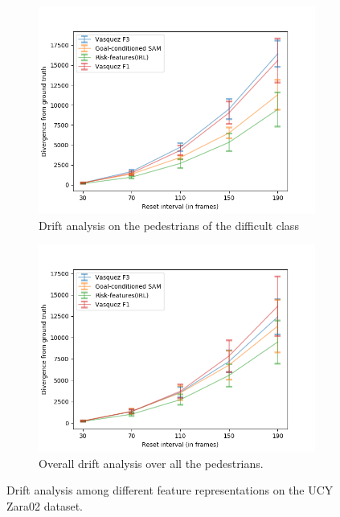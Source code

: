 \begin{figure}[htbp]
\begin{subfigure}{0.5\textwidth}
	\end{subfigure}
	\begin{subfigure}{0.5\textwidth}
		\centering
		\includegraphics[width=\linewidth]{plots/zara02_inter_irl_adjusted_speed/drift_hard_inter_irl_zara02_adjusted.png}
		\caption {Drift analysis on the pedestrians of the difficult class}
		\label{fig:inter_IRL-drift_analysis_hard-zara02}
	\end{subfigure}
	\begin{subfigure}{0.5\textwidth}
		\centering
		\includegraphics[width=\linewidth]{plots/zara02_inter_irl_adjusted_speed/drift_all_inter_irl_zara02_adjusted.png}
		\caption {Overall drift analysis over all the pedestrians.}
		\label{fig:inter_IRL-drift_analysis_all-zara02}
	\end{subfigure}
	\caption{Drift analysis among different feature representations on the UCY Zara02 dataset.}
	\label{fig:drift_analysis-inter_IRL-zara02}
\end{figure}


